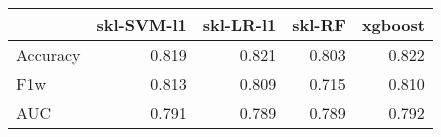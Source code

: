 \begin{tabular}{lrrrr}
\toprule
{} &  skl-SVM-l1 &  skl-LR-l1 &  skl-RF &  xgboost \\
\midrule
Accuracy &       0.819 &      0.821 &   0.803 &    0.822 \\
F1w      &       0.813 &      0.809 &   0.715 &    0.810 \\
AUC      &       0.791 &      0.789 &   0.789 &    0.792 \\
\bottomrule
\end{tabular}
